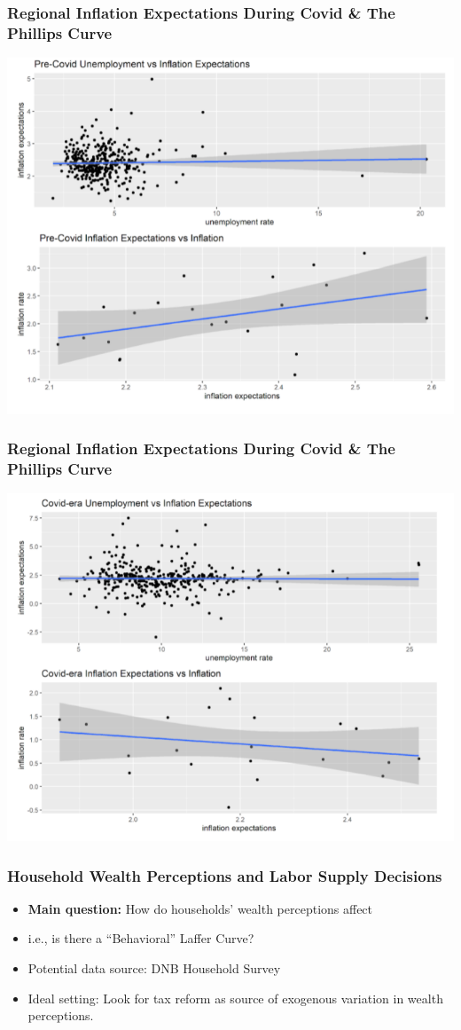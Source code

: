 \documentclass[aspectratio=169]{beamer}
\begin{document}
		\begin{frame}
			\frametitle{Regional Inflation Expectations During Covid \& The Phillips Curve}
			\centering
			\includegraphics[scale=.35]{tables-figures/Pre-Covid.png}
		\end{frame}

		\begin{frame}
			\frametitle{Regional Inflation Expectations During Covid \& The Phillips Curve}
			\centering
			\includegraphics[scale=.35]{tables-figures/Post-Covid.png}
		\end{frame}

		\begin{frame}
			\frametitle{Household Wealth Perceptions and Labor Supply Decisions}
			\begin{itemize}
				\item \textbf{Main question:} How do households' wealth perceptions affect 
				\item i.e., is there a ``Behavioral'' Laffer Curve?
				\item Potential data source: DNB Household Survey
				\item Ideal setting: Look for tax reform as source of exogenous variation in wealth perceptions.
			\end{itemize}
		\end{frame}
	
\end{document}
